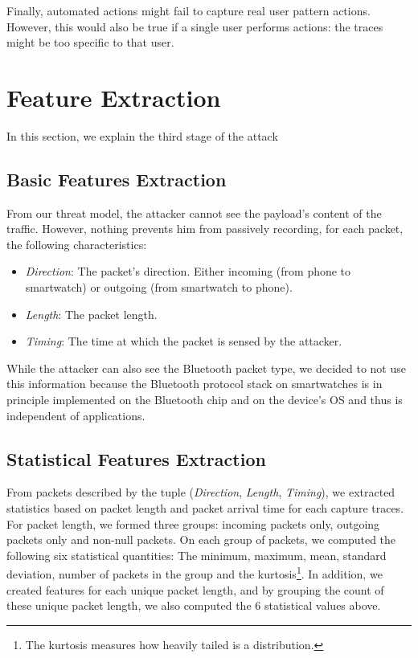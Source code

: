 Finally, automated actions might fail to capture real user pattern actions. However, this would also be true if a single user performs actions: the traces might be too specific to that user. 




\section{Feature Extraction}
\label{sec:Feature extraction}
In this section, we explain the third stage of the attack

\subsection{Basic Features Extraction} From our threat model, the attacker cannot see the payload's content of the traffic. However, nothing prevents him from passively recording, for each packet, the following characteristics: 
\begin{itemize}
    \item \textit{Direction}: The packet's direction. Either incoming (from phone to smartwatch) or outgoing (from smartwatch to phone).
    \item \textit{Length}: The packet length.
    \item \textit{Timing}: The time at which the packet is sensed by the attacker.
\end{itemize}{}


While the attacker can also see the Bluetooth packet type, we decided to not use this information because the Bluetooth protocol stack on smartwatches is in principle implemented on the Bluetooth chip and on the device's OS and thus is independent of applications.


\subsection{Statistical Features Extraction} 
From packets described by the tuple (\textit{Direction}, \textit{Length}, \textit{Timing}), we extracted statistics based on packet length and packet arrival time for each capture traces.
\\
 
 For packet length, we formed three groups: incoming packets only, outgoing packets only and non-null packets. On each group of packets, we computed the following six statistical quantities: The minimum, maximum, mean, standard deviation, number of packets in the group and the kurtosis\footnote{The kurtosis measures how heavily tailed is a distribution.}. In addition, we created features for each unique packet length, and by grouping the count of these unique packet length, we also computed the 6 statistical values above.
 \\
 
